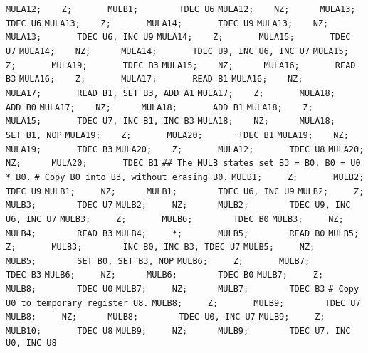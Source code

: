 \begin{apgsembly}
\begin{minipage}[t]{.49\textwidth}
\begin{algorithmic}
			\State \verb|MULA12;    Z;       MULB1;        TDEC U6|
			\State \verb|MULA12;    NZ;      MULA13;       TDEC U6|
			\State \verb|MULA13;    Z;       MULA14;       TDEC U9|
			\State \verb|MULA13;    NZ;      MULA13;       TDEC U6, INC U9|
			\State \verb|MULA14;    Z;       MULA15;       TDEC U7|
			\State \verb|MULA14;    NZ;      MULA14;       TDEC U9, INC U6, INC U7|
			\State \verb|MULA15;    Z;       MULA19;       TDEC B3|
			\State \verb|MULA15;    NZ;      MULA16;       READ B3|
			\State \verb|MULA16;    Z;       MULA17;       READ B1|
			\State \verb|MULA16;    NZ;      MULA17;       READ B1, SET B3, ADD A1|
			\State \verb|MULA17;    Z;       MULA18;       ADD B0|
			\State \verb|MULA17;    NZ;      MULA18;       ADD B1|
			\State \verb|MULA18;    Z;       MULA15;       TDEC U7, INC B1, INC B3|
			\State \verb|MULA18;    NZ;      MULA18;       SET B1, NOP|
			\State \verb|MULA19;    Z;       MULA20;       TDEC B1|
			\State \verb|MULA19;    NZ;      MULA19;       TDEC B3|
			\State \verb|MULA20;    Z;       MULA12;       TDEC U8|
			\State \verb|MULA20;    NZ;      MULA20;       TDEC B1|
			\State \verb||
			\State \verb|## The MULB states set B3 = B0, B0 = U0 * B0.|
			\State \verb|# Copy B0 into B3, without erasing B0.|
			\State \verb|MULB1;     Z;       MULB2;        TDEC U9|
			\State \verb|MULB1;     NZ;      MULB1;        TDEC U6, INC U9|
			\State \verb|MULB2;     Z;       MULB3;        TDEC U7|
			\State \verb|MULB2;     NZ;      MULB2;        TDEC U9, INC U6, INC U7|
			\State \verb|MULB3;     Z;       MULB6;        TDEC B0|
			\State \verb|MULB3;     NZ;      MULB4;        READ B3|
			\State \verb|MULB4;     *;       MULB5;        READ B0|
			\State \verb|MULB5;     Z;       MULB3;        INC B0, INC B3, TDEC U7|
			\State \verb|MULB5;     NZ;      MULB5;        SET B0, SET B3, NOP|
			\State \verb|MULB6;     Z;       MULB7;        TDEC B3|
			\State \verb|MULB6;     NZ;      MULB6;        TDEC B0|
			\State \verb|MULB7;     Z;       MULB8;        TDEC U0|
			\State \verb|MULB7;     NZ;      MULB7;        TDEC B3|
			\State \verb||
			\State \verb|# Copy U0 to temporary register U8.|
			\State \verb|MULB8;     Z;       MULB9;        TDEC U7|
			\State \verb|MULB8;     NZ;      MULB8;        TDEC U0, INC U7|
			\State \verb|MULB9;     Z;       MULB10;       TDEC U8|
			\State \verb|MULB9;     NZ;      MULB9;        TDEC U7, INC U0, INC U8|
		\end{algorithmic}
	\end{minipage}\hfill{\color{gray}\vline}\hfill
	\begin{minipage}[t]{.49\textwidth}

\end{minipage}
\end{apgsembly}
